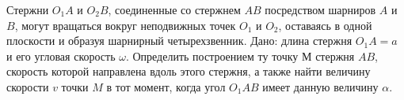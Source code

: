 Стержни $O_{1}A$ и $O_{2}B$, соединенные со стержнем $AB$ посредством шарниров $A$ и $B$, могут вращаться
вокруг неподвижных точек $O_{1}$ и $O_{2}$, оставаясь в одной плоскости и образуя шарнирный четырехзвенник.
Дано: длина стержня $O_{1}A=a$ и его угловая скорость $\omega$. Определить построением ту точку $М$ стержня
$AB$, скорость которой направлена вдоль этого стержня, а также найти величину скорости $v$ точки $M$ в тот момент,
когда угол $O_{1}AB$ имеет данную величину $\alpha$.
